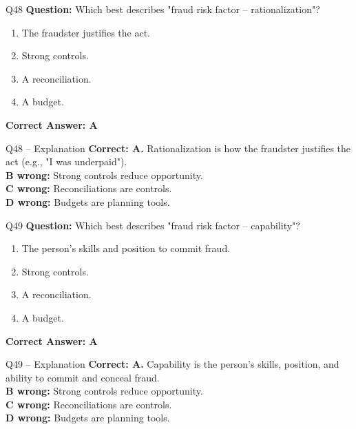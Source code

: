 \documentclass[aspectratio=169,10pt]{beamer}
\begin{document}
	\begin{frame}[t]{Q48}
		\small
		\textbf{Question:} Which best describes "fraud risk factor -- rationalization"?
		\begin{enumerate}[label=\Alph*.,itemsep=1pt,topsep=2pt]
			\item The fraudster justifies the act.
			\item Strong controls.
			\item A reconciliation.
			\item A budget.
		\end{enumerate}
		\vspace{4pt}
		\textbf{Correct Answer: A}
	\end{frame}
	
	\begin{frame}[t]{Q48 -- Explanation}
		\small
		\textbf{Correct: A.} Rationalization is how the fraudster justifies the act (e.g., "I was underpaid"). \\[4pt]
		\textbf{B wrong:} Strong controls reduce opportunity. \\[2pt]
		\textbf{C wrong:} Reconciliations are controls. \\[2pt]
		\textbf{D wrong:} Budgets are planning tools.
	\end{frame}
	
	\begin{frame}[t]{Q49}
		\small
		\textbf{Question:} Which best describes "fraud risk factor -- capability"?
		\begin{enumerate}[label=\Alph*.,itemsep=1pt,topsep=2pt]
			\item The person's skills and position to commit fraud.
			\item Strong controls.
			\item A reconciliation.
			\item A budget.
		\end{enumerate}
		\vspace{4pt}
		\textbf{Correct Answer: A}
	\end{frame}
	
	\begin{frame}[t]{Q49 -- Explanation}
		\small
		\textbf{Correct: A.} Capability is the person's skills, position, and ability to commit and conceal fraud. \\[4pt]
		\textbf{B wrong:} Strong controls reduce opportunity. \\[2pt]
		\textbf{C wrong:} Reconciliations are controls. \\[2pt]
		\textbf{D wrong:} Budgets are planning tools.
	\end{frame}
	
\end{document}
